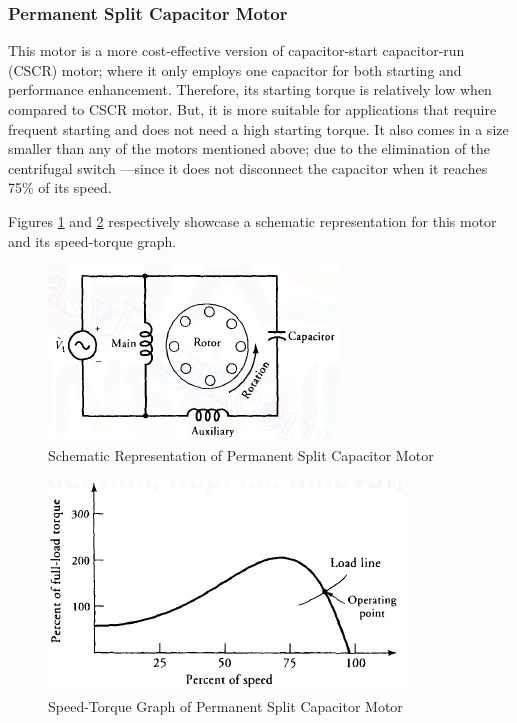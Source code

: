 \documentclass[journal]{IEEEtran}
\begin{document}
\subsubsection{Permanent Split Capacitor Motor}
This motor is a more cost-effective version of capacitor-start capacitor-run (CSCR) motor; where it only employs one capacitor for both starting and performance enhancement. Therefore, its starting torque is relatively low when compared to CSCR motor. But, it is more suitable for applications that require frequent starting and does not need a high starting torque. It also comes in a size smaller than any of the motors mentioned above; due to the elimination of the centrifugal switch —since it does not disconnect the capacitor when it reaches 75\% of its speed\cite{guru2007}.

Figures \ref{fig:permsplitcapsch} and \ref{fig:permsplitcapgraph} respectively showcase a schematic representation for this motor and its speed-torque graph.

\begin{figure}[h]
    \centering
    \includegraphics[scale=0.60]{Induction/perm_split_cap_sch.PNG}
    \caption{Schematic Representation of Permanent Split Capacitor Motor \cite{guru2007}}
    \label{fig:permsplitcapsch}
\end{figure}
\begin{figure}[!h]
    \centering
    \includegraphics[scale=0.57]{Induction/perm_split_cap_graph.PNG}
    \caption{Speed-Torque Graph of Permanent Split Capacitor Motor \cite{guru2007}}
    \label{fig:permsplitcapgraph}
\end{figure}
\end{document}
